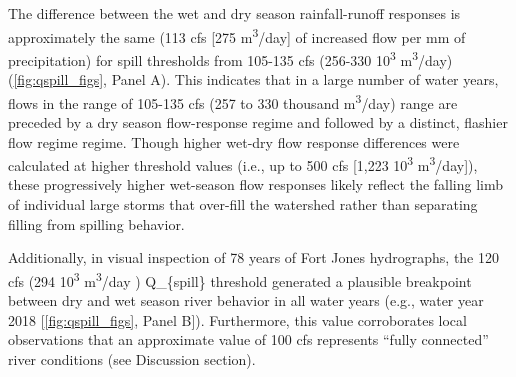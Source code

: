 \documentclass[hess, manuscript]{copernicus}
\begin{document}
The difference between the wet and dry season rainfall-runoff responses
is approximately the same (113 cfs {[}275 m\textsuperscript{3}/day{]} of
increased flow per mm of precipitation) for spill thresholds from
105-135 cfs (256-330 10\textsuperscript{3} m\textsuperscript{3}/day)
(\autoref{fig:qspill_figs}, Panel A). This indicates that in a large
number of water years, flows in the range of 105-135 cfs (257 to 330
thousand m\textsuperscript{3}/day) range are preceded by a dry season
flow-response regime and followed by a distinct, flashier flow regime
regime. Though higher wet-dry flow response differences were calculated
at higher threshold values (i.e., up to 500 cfs {[}1,223
10\textsuperscript{3} m\textsuperscript{3}/day{]}), these progressively
higher wet-season flow responses likely reflect the falling limb of
individual large storms that over-fill the watershed rather than
separating filling from spilling behavior.

Additionally, in visual inspection of 78 years of Fort Jones
hydrographs, the 120 cfs (294 10\textsuperscript{3}
m\textsuperscript{3}/day ) Q\_\{spill\} threshold generated a plausible
breakpoint between dry and wet season river behavior in all water years
(e.g., water year 2018 {[}\autoref{fig:qspill_figs}, Panel B{]}).
Furthermore, this value corroborates local observations that an
approximate value of 100 cfs represents ``fully connected'' river
conditions (see Discussion section).
\end{document}
